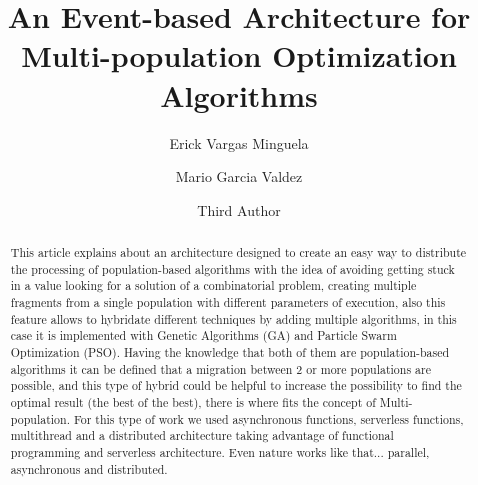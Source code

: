 \documentclass[runningheads]{llncs}
\begin{document}
%
\title{An Event-based Architecture for Multi-population Optimization Algorithms}
%
%
\author{Erick Vargas Minguela \and
Mario Garcia Valdez \and
Third Author}
%
%
%
\maketitle              %
%
\begin{abstract}
    This article explains about an architecture designed to create an easy way to
    distribute the processing of population-based algorithms with the idea of avoiding 
    getting stuck in a value looking for a solution of a combinatorial problem, creating 
    multiple fragments from a single population with different
    parameters of execution, also this feature allows to hybridate different techniques by adding multiple algorithms,
     in this case it is implemented with Genetic Algorithms (GA) and Particle Swarm Optimization (PSO). 
    Having the knowledge that both of them are population-based algorithms it
    can be defined that a migration between 2 or more populations are possible,
    and this type of hybrid could be helpful to increase the possibility to find the
    optimal result (the best of the best), there is where fits the concept of
    Multi-population. For this type of work we used asynchronous functions,
    serverless functions, multithread and a distributed architecture taking
    advantage of functional programming and serverless architecture. Even
    nature works like that... parallel, asynchronous and distributed.



\end{abstract}
%
%
%
\end{document}
